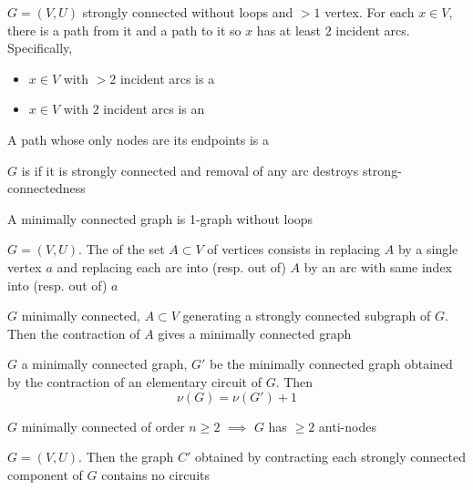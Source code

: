\documentclass[aspectratio=169]{beamer}\usepackage[]{graphicx}\usepackage[]{xcolor}
\begin{document}
\begin{frame}
\begin{definition}
$G=(V,U)$ strongly connected without loops and $>1$ vertex. For each $x\in V$, there is a path from it and a path to it so $x$ has at least 2 incident arcs. Specifically,
\begin{itemize}
\item $x\in V$ with $>2$ incident arcs is a 
\item $x\in V$ with $2$ incident arcs is an 
\end{itemize}
A path whose only nodes are its endpoints is a 
\end{definition}
\end{frame}

\begin{frame}
\begin{definition}
$G$ is  if it is strongly connected and removal of any arc destroys strong-connectedness
\end{definition}
A minimally connected graph is 1-graph without loops
\vfill
\begin{definition}[Contraction]
$G=(V,U)$. The  of the set $A\subset V$ of vertices consists in replacing $A$ by a single vertex $a$ and replacing each arc into (resp. out of) $A$ by an arc with same index into (resp. out of) $a$
\end{definition}
\end{frame}


\begin{frame}
\begin{theorem}
$G$ minimally connected, $A\subset V$ generating a strongly connected subgraph of $G$. Then the contraction of $A$ gives a minimally connected graph
\end{theorem}
\end{frame}

\begin{frame} 
\begin{theorem}
$G$ a minimally connected graph, $G'$ be the minimally connected graph obtained by the contraction of an elementary circuit of $G$.	Then
\[
\nu(G)=\nu(G')+1
\]
\end{theorem}
\vfill
\begin{theorem}
$G$ minimally connected of order $n\geq 2$ $\implies$ $G$ has $\geq 2$ anti-nodes
\end{theorem}
\vfill
\begin{theorem}
$G=(V,U)$. Then the graph $C'$ obtained by contracting each strongly connected component of $G$ contains no circuits
\end{theorem}
\end{frame}
\end{document}
